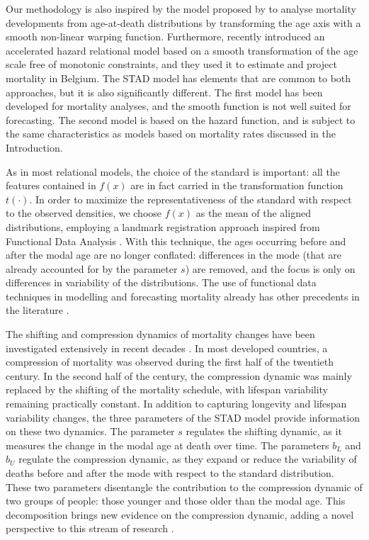 \documentclass[Thesis]{subfiles}
\begin{document}
Our methodology is also inspired by the model proposed by
\cite{camarda2008warped} to analyse mortality developments from
age-at-death distributions by transforming the age axis with a smooth
non-linear warping function. Furthermore, \cite{cadena2016semi}
recently introduced an accelerated hazard relational model based on a
smooth transformation of the age scale free of monotonic
constraints, and they used it to estimate and project mortality in
Belgium. The STAD model has elements that are common to both
approaches, but it is also significantly different. The first model
has been developed for mortality analyses, and the smooth function is
not well suited for forecasting. The second model is based on the
hazard function, and is subject to the same characteristics as models
based on mortality rates discussed in the Introduction. 

As in most relational models, the choice of the standard is important:
all the features contained in $f(x)$ are in fact carried in the
transformation function $t(\cdot)$. In order to maximize the
representativeness of the standard with respect to the observed
densities, we choose $f(x)$ as the mean of the aligned distributions, employing a landmark registration approach inspired from
Functional Data Analysis \citep{ramsay2005FDA}. With this technique,
the ages occurring before and after the modal age are no longer
conflated: differences in the mode (that are already accounted
for by the parameter $s$) are removed, and the focus is only on differences in variability of the distributions. The use of functional data
techniques in modelling and forecasting mortality already has other
precedents in the literature
\citep{hyndman2007robust,hyndman2008stochastic,hyndman2013coherent}. 

The shifting and compression dynamics of mortality changes have been
investigated extensively in recent decades \citep[for
example,][]{fries1980aging,kannisto2000measuring,bongaarts2002long,bongaarts2005long,canudas2008modal,thatcher2010compression,bergeron2015decomposing,de2016new}. In most developed countries, a compression of mortality was observed
during the first half of the twentieth century. In the second half of
the century, the compression dynamic was mainly replaced by the
shifting of the mortality schedule, with lifespan variability
remaining practically constant. In addition to capturing longevity and
lifespan variability changes, the three parameters of the STAD model
provide information on these two dynamics. The parameter $s$ regulates
the shifting dynamic, as it measures the change in the modal age at
death over time. The parameters $b_L$ and $b_U$ regulate the
compression dynamic, as they expand or reduce the variability of
deaths before and after the mode with respect to the standard
distribution. These two parameters disentangle the 
contribution to the compression dynamic of two groups of people: those
younger and those older than the modal age.  This decomposition brings new evidence on the compression dynamic, adding a novel perspective to this stream
of research \citep{fries1980aging,myers1984compression,wilmoth1997search,wilmoth1999rectangularization,lynch2001reconsidering}.
\end{document}
